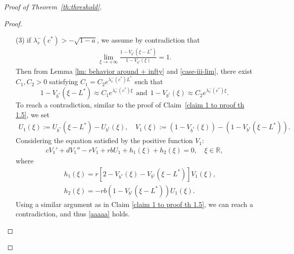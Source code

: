 \documentclass[11pt,a4paper]{article}
\numberwithin{equation}{section}
\numberwithin{figure}{section}
\newcommand\bea{\begin{eqnarray}}
\newcommand\eea{\end{eqnarray}}
\newcommand\beaa{\begin{eqnarray*}}
\newcommand\eeaa{\end{eqnarray*}}
\begin{document}
\begin{proof}[Proof of Theorem~\ref{th:threshold}]
\begin{proof}
\begin{itemize}
    \item[(3)] if $\lambda_v^-(c^*)> -\sqrt{1-a}$, we assume by contradiction that
\bea\label{case-iii-lim}
\lim_{\xi\to+\infty}\frac{1-V_{b^*}(\xi-L^*)}{1-V_{b^\dag}(\xi)}=1.
\eea
Then from Lemma \ref{lm: behavior around + infty} and \eqref{case-iii-lim}, there exist $C_1,C_2>0$ satisfying $C_1=C_2e^{\lambda_v^-(c^*) L^*}$ such that 
$$1-V_{b^*}(\xi-L^*)\approx C_1e^{\lambda_v^-(c^*)\xi}\ \ \text{and}\ \ 1-V_{b^\dag}(\xi)\approx C_2e^{\lambda_v^-(c^*)\xi}.$$
To reach a contradiction, similar to the proof of Claim~\ref{claim 1 to proof th 1.5}, we set
\beaa
U_1(\xi):=U_{b^*}(\xi-L^*)-U_{b^\dag}(\xi), \quad V_1(\xi):= (1-V_{b^*}(\xi))-(1-V_{b^\dag}(\xi-L^*)).
\eeaa
Considering the equation satisfied by the positive function $V_1$:
\beaa
cV_1'+dV_1''-rV_1+rbU_1+h_1(\xi)+h_2(\xi)=0,\quad \xi\in\mathbb{R},
\eeaa
where
\beaa
&&h_1(\xi)=r[2-V_{b^*}(\xi)-V_{b^\dag}(\xi-L^*)]V_1(\xi),\\
&&h_2(\xi)=-r b(1-V_{b^\dag}(\xi-L^*))U_1(\xi).
\eeaa
Using a similar argument as in Claim \ref{claim 1 to proof th 1.5}, we can reach a contradiction, and thus \eqref{aaaaa} holds.
\end{itemize}





\end{proof}
\end{proof}
\end{document}
